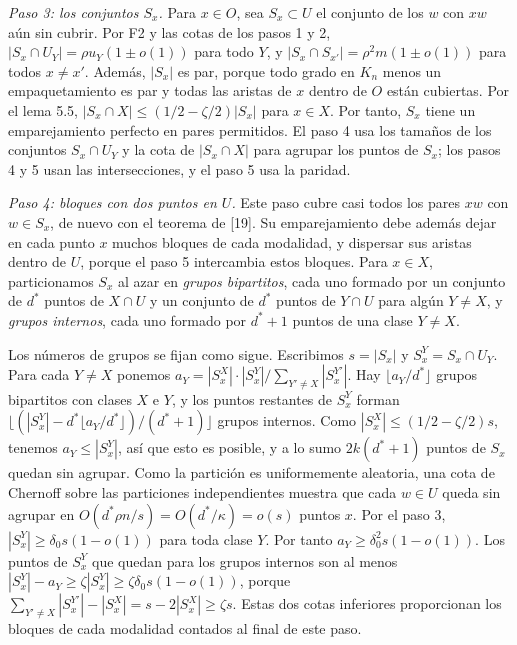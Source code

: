 \documentclass[spanish,11pt,a4paper]{article}
\begin{document}
\emph{Paso 3: los conjuntos \(S_x\).} Para \(x\in O\), sea \(S_x\subset U\) el conjunto de los \(w\) con \(xw\) aún sin cubrir. Por F2 y las cotas de los pasos 1 y 2, \(|S_x\cap U_Y|=\rho u_Y(1\pm o(1))\) para todo \(Y\), y \(|S_x\cap S_{x'}|=\rho^2m(1\pm o(1))\) para todos \(x\ne x'\). Además, \(|S_x|\) es par, porque todo grado en \(K_n\) menos un empaquetamiento es par y todas las aristas de \(x\) dentro de \(O\) están cubiertas. Por el lema 5.5, \(|S_x\cap X|\le(1/2-\zeta/2)|S_x|\) para \(x\in X\). Por tanto, \(S_x\) tiene un emparejamiento perfecto en pares permitidos. El paso 4 usa los tamaños de los conjuntos \(S_x\cap U_Y\) y la cota de \(|S_x\cap X|\) para agrupar los puntos de \(S_x\); los pasos 4 y 5 usan las intersecciones, y el paso 5 usa la paridad.

\emph{Paso 4: bloques con dos puntos en \(U\).} Este paso cubre casi todos los pares \(xw\) con \(w\in S_x\), de nuevo con el teorema de {[}19{]}. Su emparejamiento debe además dejar en cada punto \(x\) muchos bloques de cada modalidad, y dispersar sus aristas dentro de \(U\), porque el paso 5 intercambia estos bloques. Para \(x\in X\), particionamos \(S_x\) al azar en \emph{grupos bipartitos}, cada uno formado por un conjunto de \(d^*\) puntos de \(X\cap U\) y un conjunto de \(d^*\) puntos de \(Y\cap U\) para algún \(Y\ne X\), y \emph{grupos internos}, cada uno formado por \(d^*+1\) puntos de una clase \(Y\ne X\).

Los números de grupos se fijan como sigue. Escribimos \(s=|S_x|\) y \(S_x^Y=S_x\cap U_Y\). Para cada \(Y\ne X\) ponemos \(a_Y=|S_x^X|\cdot|S_x^Y|/\sum_{Y'\ne X}|S_x^{Y'}|\). Hay \(\lfloor a_Y/d^*\rfloor\) grupos bipartitos con clases \(X\) e \(Y\), y los puntos restantes de \(S_x^Y\) forman \(\lfloor(|S_x^Y|-d^*\lfloor a_Y/d^*\rfloor)/(d^*+1)\rfloor\) grupos internos. Como \(|S_x^X|\le(1/2-\zeta/2)s\), tenemos \(a_Y\le|S_x^Y|\), así que esto es posible, y a lo sumo \(2k(d^*+1)\) puntos de \(S_x\) quedan sin agrupar. Como la partición es uniformemente aleatoria, una cota de Chernoff sobre las particiones independientes muestra que cada \(w\in U\) queda sin agrupar en \(O(d^*\rho n/s)=O(d^*/\kappa)=o(s)\) puntos \(x\). Por el paso 3, \(|S_x^Y|\ge\delta_0s(1-o(1))\) para toda clase \(Y\). Por tanto \(a_Y\ge\delta_0^2s(1-o(1))\). Los puntos de \(S_x^Y\) que quedan para los grupos internos son al menos \(|S_x^Y|-a_Y\ge\zeta|S_x^Y|\ge\zeta\delta_0s(1-o(1))\), porque \(\sum_{Y'\ne X}|S_x^{Y'}|-|S_x^X|=s-2|S_x^X|\ge\zeta s\). Estas dos cotas inferiores proporcionan los bloques de cada modalidad contados al final de este paso.
\end{document}
